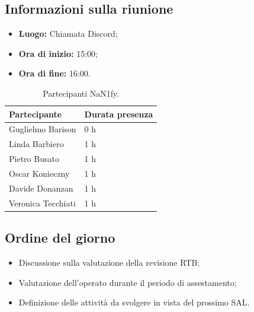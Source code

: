 \documentclass[8pt]{article}
\begin{document}
\subsection{Informazioni sulla riunione}
\begin{itemize}
	\setlength\itemsep{0em}
	\item\textbf{Luogo:} Chiamata Discord;
	\item\textbf{Ora di inizio:} 15:00;
	\item\textbf{Ora di fine:}  16:00.
\end{itemize}
\begin{table}[ht!]
	\begin{minipage}[t]{0.5\linewidth}
		\centering
		\begin{tabular}{p{3cm} p{3cm}}
			\toprule
			\textbf{Partecipante} & \textbf{Durata presenza} \\
			\midrule
			Guglielmo Barison & 0 h \\
			Linda Barbiero & 1 h \\
			Pietro Busato & 1 h \\
			Oscar Konieczny & 1 h \\
			Davide Donanzan & 1 h \\
			Veronica Tecchiati & 1 h \\
			\bottomrule
		\end{tabular}
		\caption{Partecipanti NaN1fy.}
		\label{table:Partecipanti NaN1fy}
	\end{minipage} 
\end{table}
\subsection{Ordine del giorno}
\begin{itemize}
	\setlength\itemsep{0em}
    \item Discussione sulla valutazione della revisione RTB;
    \item Valutazione dell'operato durante il periodo di assestamento;
    \item Definizione delle attività da svolgere in vista del prossimo SAL.
\end{itemize}
\end{document}

